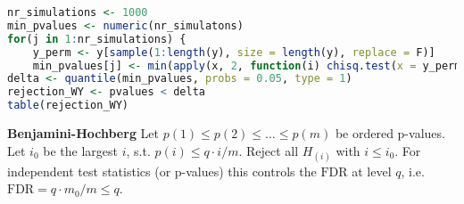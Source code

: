 \begin{lstlisting}[language=R]
nr_simulations <- 1000
min_pvalues <- numeric(nr_simulatons)
for(j in 1:nr_simulations) {
    y_perm <- y[sample(1:length(y), size = length(y), replace = F)]
    min_pvalues[j] <- min(apply(x, 2, function(i) chisq.test(x = y_perm,y = i)$p.value))  }
delta <- quantile(min_pvalues, probs = 0.05, type = 1)
rejection_WY <- pvalues < delta
table(rejection_WY)
\end{lstlisting}

\textbf{Benjamini-Hochberg}
Let $p(1)\leq p(2) \leq ... \leq p(m)$ be ordered p-values. Let $i_0$ be the largest $i$, s.t. $p(i)\leq q\cdot i / m$. Reject all $H_{(i)}$ with $i\leq i_0$. For independent test statistics (or p-values) this controls the $\text{FDR}$ at level $q$, i.e. $\text{FDR}=q\cdot m_0 / m \leq q$.
